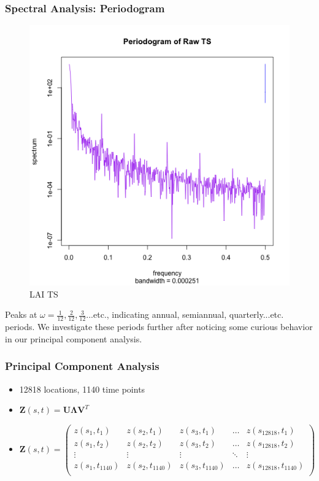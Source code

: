 \documentclass{beamer}
\begin{document}
\begin{frame}
	\frametitle{Spectral Analysis: Periodogram}
	\begin{figure}
		\centering
		\includegraphics[width=0.5\linewidth]{../img/RawSpec_LAI.png}
		\caption{LAI TS}
	\end{figure}
	Peaks at $\omega=\frac{1}{12},\frac{2}{12}, \frac{3}{12}...$etc., indicating annual, semiannual, quarterly...etc. periods. We investigate these periods further after noticing some curious behavior in our principal component analysis.
\end{frame}

\begin{frame}
\frametitle{Principal Component Analysis}
\begin{itemize}
	\item 12818 locations, 1140 time points
	\item $\mathbf{Z}(s,t) = \mathbf{U}\mathbf{\Lambda}\mathbf{V}^T$  
	\item $\mathbf{Z}(s,t)  = \begin{pmatrix}
	z(s_1, t_1) & z(s_2, t_1) & z(s_3, t_1) & \dots & z(s_{12818}, t_1) \\
	z(s_1, t_2) & z(s_2, t_2) & z(s_3, t_2) & \dots & z(s_{12818}, t_2) \\
	\vdots & \vdots & \vdots & \ddots & \vdots\\
	z(s_1, t_{1140}) & z(s_2, t_{1140}) & z(s_3, t_{1140}) & \dots & z(s_{12818}, t_{1140})\\ 
	\end{pmatrix}$
\end{itemize}
\end{frame}
\end{document}
